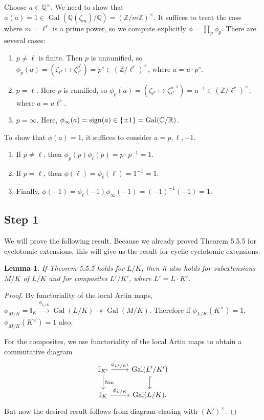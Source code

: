 \documentclass[leqno, openany]{memoir}
\newtheorem{lem}[thm]{Lemma}
\theoremstyle{definition}
\theoremstyle{remark}
\theoremstyle{plain}
\theoremstyle{definition}
\theoremstyle{remark}
\newcommand{\R}{\mathbb{R}}
\newcommand{\C}{\mathbb{C}}
\newcommand{\Z}{\mathbb{Z}}
\newcommand{\Q}{\mathbb{Q}}
\newcommand{\I}{\mathbb{I}}
\newcommand{\mr}[1]{\mathrm{#1}}
\DeclareMathOperator{\Gal}{Gal}
\DeclareMathOperator{\Nm}{Nm}
\begin{document}
Choose $a \in \Q^{\times}$. We need to show that $\phi(a) = 1 \in
\Gal(\Q(\zeta_m)/\Q) = {(\Z/m\Z)}^{\times}$. It suffices to treat the case
where $m = \ell^r$ is a prime power, so we compute explicitly $\phi = \prod_p
\phi_p$. There are several cases: \begin{enumerate} \item $p \neq \ell$ is
    finite. Then $p$ is unramified, so $\phi_p(a) = (\zeta_{\ell^r} \mapsto
    \zeta_{\ell^r}^{p^s}) = p^s \in {(\Z/\ell^r)}^{\times}$, where $a = u \cdot
    p^s$.  \item $p=\ell$. Here $p$ is ramified, so $\phi_p(a) =
    (\zeta_{\ell^r} \mapsto \zeta_{\ell^r}^{u^{-1}}) = u^{-1} \in
    {(\Z/\ell^r)}^{\times}$, where $a=u\ell^s$.  \item $p=\infty$. Here,
$\phi_{\infty}(a) = \mr{sign}(a) \in \qty{\pm 1} = \Gal(\C/\R)$.
\end{enumerate} To show that $\phi(a) = 1$, it suffices to consider $a=p, \ell,
-1$.  \begin{enumerate} \item If $p\neq \ell$, then $\phi_p(p) \phi_{\ell}(p) =
    p \cdot p^{-1} = 1$.  \item If $p=\ell$, then $\phi(\ell) =
    \phi_{\ell}(\ell) = 1^{-1} = 1$.  \item Finally, $\phi(-1) =
    \phi_{\ell}(-1) \phi_{\infty}(-1) = {(-1)}^{-1} (-1) = 1$.  \end{enumerate}

\subsection{Step 1}%

We will prove the following result. Because we already proved Theorem 5.5.5 for
cyclotomic extensions, this will give us the result for cyclic cyclotomic
extensions.  \begin{lem} If Theorem 5.5.5 holds for $L/K$, then it also holds
    for subextensions $M/K$ of $L/K$ and for composites $L'/K'$, where $L' = L
    \cdot K'$.  \end{lem}

\begin{proof} By functoriality of the local Artin maps, $\phi_{M/K} = \I_K
    \xrightarrow{\phi_{L/K}} \Gal(L/K) \twoheadrightarrow \Gal(M/K)$. Therefore
    if $\phi_{L/K}(K^{\times}) = 1$, $\phi_{M/K}(K^{\times}) = 1$ also.

    For the composites, we use functoriality of the local Artin maps to obtain
    a commutative diagram \begin{equation*} \begin{tikzcd} \I_{K'}
        \ar{r}{\phi_{L'/K'}} \ar{d}{\Nm} & \Gal(L'/K') \ar[hookrightarrow]{d}
        \\ \I_K \ar{r}{\phi_{L/K}} & \Gal(L/K).  \end{tikzcd} \end{equation*}
    But now the desired result follows from diagram chasing with
${(K')}^{\times}$.  \end{proof}
\end{document}
